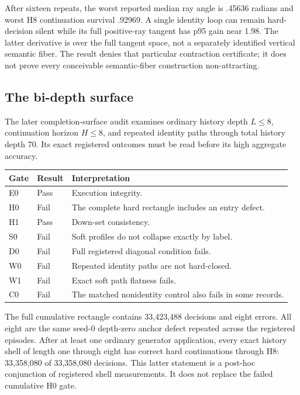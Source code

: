 \documentclass[11pt]{article}
\begin{document}
After sixteen repeats, the worst reported median ray angle is .45636 radians and worst H8 continuation survival .92969. A single identity loop can remain hard-decision silent while its full positive-ray tangent has p95 gain near 1.98. The latter derivative is over the full tangent space, not a separately identified vertical semantic fiber. The result denies that particular contraction certificate; it does not prove every conceivable semantic-fiber construction non-attracting.

\subsection{The bi-depth surface}
The later completion-surface audit examines ordinary history depth \(L\le8\), continuation horizon \(H\le8\), and repeated identity paths through total history depth 70. Its exact registered outcomes must be read before its high aggregate accuracy. \cite{ncs}

\begin{center}\begin{tabularx}{\textwidth}{l l X}
\toprule Gate & Result & Interpretation\\\midrule
E0 & Pass & Execution integrity.\\
H0 & Fail & The complete hard rectangle includes an entry defect.\\
H1 & Pass & Down-set consistency.\\
S0 & Fail & Soft profiles do not collapse exactly by label.\\
D0 & Fail & Full registered diagonal condition fails.\\
W0 & Fail & Repeated identity paths are not hard-closed.\\
W1 & Fail & Exact soft path flatness fails.\\
C0 & Fail & The matched nonidentity control also fails in some records.\\\bottomrule
\end{tabularx}\end{center}
The full cumulative rectangle contains 33,423,488 decisions and eight errors. All eight are the same seed-0 depth-zero anchor defect repeated across the registered episodes. After at least one ordinary generator application, every exact history shell of length one through eight has correct hard continuations through H8: 33,358,080 of 33,358,080 decisions. This latter statement is a post-hoc conjunction of registered shell measurements. It does not replace the failed cumulative H0 gate.
\end{document}

